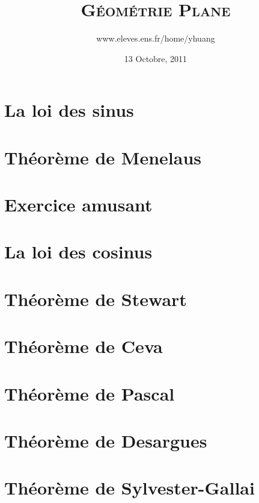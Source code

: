 \documentclass{article}
\begin{document}
\title{\textsc{G\'eom\'etrie Plane}}
\author{www.eleves.ens.fr/home/yhuang}
\date{13 Octobre, 2011}

\maketitle

\section{La loi des sinus}
\section{Th\'eor\`eme de Menelaus}
\section{Exercice amusant}
\section{La loi des cosinus}
\section{Th\'eor\`eme de Stewart}
\section{Th\'eor\`eme de Ceva}
\section{Th\'eor\`eme de Pascal}
\section{Th\'eor\`eme de Desargues}
\section{Th\'eor\`eme de Sylvester-Gallai}
\end{document}
